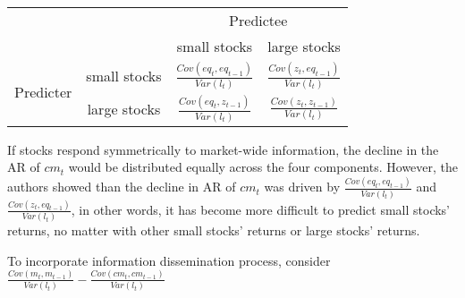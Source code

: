 \begin{enumerate}
    \begin{center}
        \begin{tabular}{cccc} 
        \hline
        & & \multicolumn{2}{c}{Predictee} \\
        & &small stocks & large stocks\\
        \hline
        \multirow{2}{4em}{Predicter} & small stocks & $\frac{Cov(eq_t,eq_{t-1})}{Var(l_t)}$ & $\frac{Cov(z_t,eq_{t-1})}{Var(l_t)}$ \\ 
        & large stocks & $\frac{Cov(eq_t,z_{t-1})}{Var(l_t)}$ & $\frac{Cov(z_t,z_{t-1})}{Var(l_t)}$ \\ 
        \hline
        \end{tabular}
    \end{center}

    If stocks respond symmetrically to market-wide information, the decline in the AR of $cm_t$ would be distributed equally across the four components. However, the authors showed than the decline in AR of $cm_t$ was driven by $\frac{Cov(eq_t,eq_{t-1})}{Var(l_t)}$ and $\frac{Cov(z_t,eq_{t-1})}{Var(l_t)}$,
    in other words, it has become more difficult to predict small stocks' returns, no matter with other small stocks' returns or large stocks' returns. 
    
    To incorporate information dissemination process, consider $\frac{Cov(m_t,m_{t-1})}{Var(l_t)}-\frac{Cov(cm_t,cm_{t-1})}{Var(l_t)}$
\end{enumerate}
